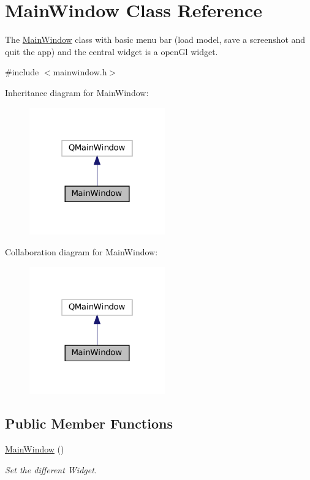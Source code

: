 \hypertarget{class_main_window}{}\section{Main\+Window Class Reference}
\label{class_main_window}


The \mbox{\hyperlink{class_main_window}{Main\+Window}} class with basic menu bar (load model, save a screenshot and quit the app) and the central widget is a open\+Gl widget.  




{\ttfamily \#include $<$mainwindow.\+h$>$}



Inheritance diagram for Main\+Window\+:
\nopagebreak
\begin{figure}[H]
\begin{center}
\leavevmode
\includegraphics[width=166pt]{class_main_window__inherit__graph}
\end{center}
\end{figure}


Collaboration diagram for Main\+Window\+:
\nopagebreak
\begin{figure}[H]
\begin{center}
\leavevmode
\includegraphics[width=166pt]{class_main_window__coll__graph}
\end{center}
\end{figure}
\subsection*{Public Member Functions}
\begin{DoxyCompactItemize}
\item 
\mbox{\label{class_main_window_a34c4b4207b46d11a4100c9b19f0e81bb}} 
\mbox{\hyperlink{class_main_window_a34c4b4207b46d11a4100c9b19f0e81bb}{Main\+Window}} ()
\begin{DoxyCompactList}\small\item\em Set the different Widget. \end{DoxyCompactList}\end{DoxyCompactItemize}
